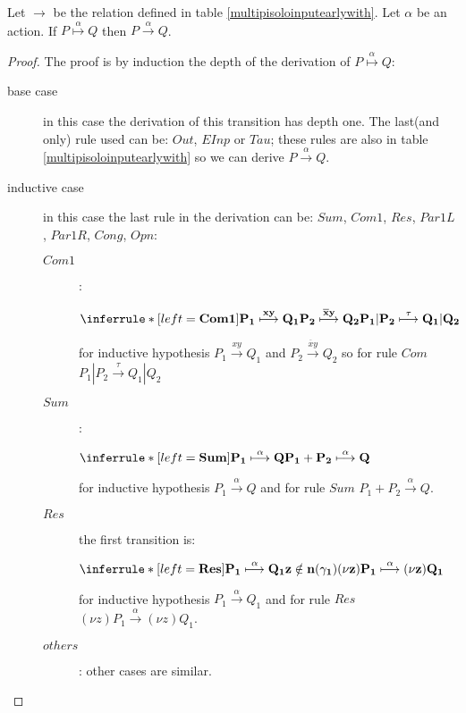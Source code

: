 





\begin{proposition}
  Let $\rightarrow$ be the relation defined in table \ref{multipisoloinputearlywith}. Let $\alpha$ be an action. If $P \stackrel{\alpha}{\longmapsto} Q$ then $P\xrightarrow{\alpha} Q$.
  \begin{proof}
    The proof is by induction the depth of the derivation of $P \stackrel{\alpha}{\longmapsto} Q$:
    \begin{description}
      \item[base case]
	in this case the derivation of this transition has depth one. The last(and only) rule used can be: $Out$, $EInp$ or $Tau$; these rules are also in table \ref{multipisoloinputearlywith} so we can derive $P\xrightarrow{\alpha} Q$. 
      \item[inductive case]
	in this case the last rule in the derivation can be: $Sum$, $Com1$, $Res$, $Par1L$, $Par1R$, $Cong$, $Opn$:
	\begin{description}
	  \item[$Com1$]:
	    \begin{center}
	      $\inferrule* [left=\bf{Com1}]{
		  P_{1} \stackrel{xy}{\longmapsto} Q_{1}
		\\
		  P_{2} \stackrel{\overline{x}y}{\longmapsto} Q_{2}
	      }{
		P_{1}|P_{2} \stackrel{\tau}{\longmapsto} Q_{1}|Q_{2}
	      }$ 
	    \end{center}
	    for inductive hypothesis $P_{1} \xrightarrow{xy} Q_{1}$ and $P_{2} \xrightarrow{\overline{x}y} Q_{2}$ so for rule $Com$ $P_{1}|P_{2} \xrightarrow{\tau} Q_{1}|Q_{2}$
	  \item[$Sum$]:
	    \begin{center}
	      $\inferrule* [left=\bf{Sum}]{
		P_{1} \stackrel{\alpha}{\longmapsto} Q
	      }{
		P_{1}+P_{2} \stackrel{\alpha}{\longmapsto} Q
	      }$ 
	    \end{center}
	    for inductive hypothesis $P_{1} \xrightarrow{\alpha} Q$ and for rule $Sum$ $P_{1}+P_{2} \xrightarrow{\alpha} Q$.
	  \item[$Res$] the first transition is:
	    \begin{center}
	      $\inferrule* [left=\bf{Res}]{
		  P_{1} \stackrel{\alpha}{\longmapsto} Q_{1}
		\\
		  z\notin n(\gamma_{1})
	      }{
		(\nu z) P_{1} \stackrel{\alpha}{\longmapsto} (\nu z)Q_{1}
	      }$ 
	    \end{center}		
	    for inductive hypothesis $P_{1} \xrightarrow{\alpha} Q_{1}$ and for rule $Res$ $(\nu z)P_{1} \xrightarrow{\alpha} (\nu z)Q_{1}$.
	 \item[$others$]: other cases are similar.
      \end{description}	    
    \end{description}	    
  \end{proof}
\end{proposition}
